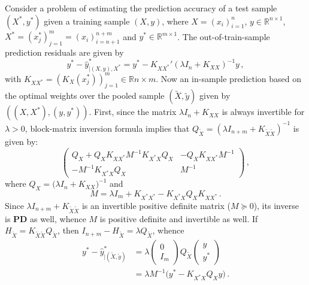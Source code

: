 \documentclass[a4paper,14pt]{extarticle}
\newcommand{\Real}{\mathbb{R}}
\begin{document}
Consider a problem of estimating the prediction accuracy of a test sample $(X^*, y^*)$
given a training sample $(X, y)$, where $X = (x_i)_{i=1}^n$, $y\in \Real^{n\times 1}$,
$X^* = (x^*_j)_{j=1}^m = (x_i)_{i=n+1}^{n+m}$ and $y^*\in \Real^{m\times 1}$. 
The out-of-train-sample prediction residuals are given by
\begin{equation*}
  y^* - \hat{y}^*_{|(X, y), X^*}
    = y^* - K_{XX^*}' (\lambda I_n + K_{XX})^{-1} y
    \,,
\end{equation*}
with $K_{XX^*} = (K_X(x^*_j))_{j=1}^m \in \Real{n\times m}$.
Now an in-sample prediction based on the optimal weights over the pooled sample
$(\tilde{X}, \tilde{y})$ given by $((X, X^*), (y, y^*))$. First, since the matrix
$\lambda I_n + K_{XX}$ is always invertible for $\lambda > 0$, block-matrix inversion
formula implies that $Q_{\tilde{X}} = (\lambda I_{n+m} + K_{\tilde{X}\tilde{X}})^{-1}$
is given by:
\begin{equation*}
  \begin{pmatrix}
    Q_X + Q_X K_{XX^*} M^{-1} K_{X^*X} Q_X & - Q_X K_{XX^*} M^{-1} \\
    - M^{-1} K_{X^*X} Q_X & M^{-1}
  \end{pmatrix}
  \,,
\end{equation*}
where $Q_X = \bigl( \lambda I_n + K_{XX} \bigr)^{-1}$ and
\begin{equation*}
  M = \lambda I_m + K_{X^*X^*} - K_{X^*X} Q_X K_{XX^*} \,.
\end{equation*}
Since $\lambda I_{n+m} + K_{\tilde{X}\tilde{X}}$ is an invertible positive definite
matrix ($M\succeq 0$), its inverse is \textbf{PD} as well, whence $M$ is positive
definite and invertible as well. If $H_{\tilde{X}} = K_{\tilde{X}\tilde{X}} Q_{\tilde{X}}$,
then $I_{n+m} - H_{\tilde{X}} = \lambda Q_{\tilde{X}}$, whence
\begin{align}
  y^* - \hat{y}^*_{|(\tilde{X}, \tilde{y})}
    &= \lambda \begin{pmatrix} 0\\ I_m \end{pmatrix} Q_{\tilde{X}}
        \begin{pmatrix} y\\ y^* \end{pmatrix} \nonumber \\
    &= \lambda M^{-1} \bigl( y^* - K_{X^*X} Q_X y \bigr) %
    \label{eq:holdout_resid}
    \,.
\end{align}
\end{document}
